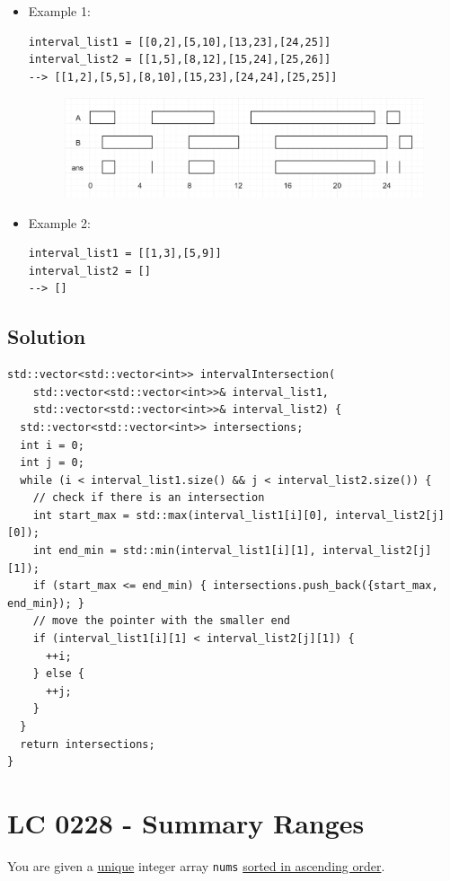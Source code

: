 \begin{itemize}
\item Example 1:
\begin{lstlisting}
interval_list1 = [[0,2],[5,10],[13,23],[24,25]]
interval_list2 = [[1,5],[8,12],[15,24],[25,26]]
--> [[1,2],[5,5],[8,10],[15,23],[24,24],[25,25]]
\end{lstlisting}
\begin{figure}[H]
\centering
\includegraphics[width=0.7\linewidth]{images/lc0986_eg1}
\end{figure}
\item Example 2:
\begin{lstlisting}
interval_list1 = [[1,3],[5,9]]
interval_list2 = []
--> []
\end{lstlisting}
\end{itemize}

\subsection*{Solution}
\begin{lstlisting}
std::vector<std::vector<int>> intervalIntersection(
    std::vector<std::vector<int>>& interval_list1,
    std::vector<std::vector<int>>& interval_list2) {
  std::vector<std::vector<int>> intersections;
  int i = 0;
  int j = 0;
  while (i < interval_list1.size() && j < interval_list2.size()) {
    // check if there is an intersection
    int start_max = std::max(interval_list1[i][0], interval_list2[j][0]);
    int end_min = std::min(interval_list1[i][1], interval_list2[j][1]);
    if (start_max <= end_min) { intersections.push_back({start_max, end_min}); }
    // move the pointer with the smaller end
    if (interval_list1[i][1] < interval_list2[j][1]) {
      ++i;
    } else {
      ++j;
    }
  }
  return intersections;
}
\end{lstlisting}

\section{LC 0228 - Summary Ranges}\label{lc228}
You are given a \ul{unique} integer array {\colorbox{CodeBackground}{\lstinline|nums|}} \ul{sorted in ascending order}.\\


